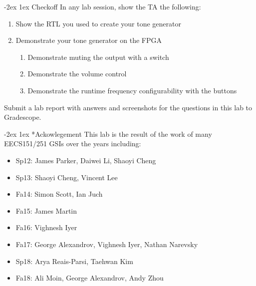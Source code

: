 \documentclass[11pt]{article}
\makeatletter
\renewcommand{\section}
{\@startsection {section}{1}{0pt}
 {-2ex}
 {1ex}
 {\bfseries\Large}}
\makeatother
\begin{document}
\section{Checkoff}
In any lab session, show the TA the following:
\begin{enumerate}
  \item Show the RTL you used to create your tone generator
  \item Demonstrate your tone generator on the FPGA
    \begin{enumerate}
      \item Demonstrate muting the output with a switch
      \item Demonstrate the volume control
      \item Demonstrate the runtime frequency configurability with the buttons
    \end{enumerate}
\end{enumerate}

Submit a lab report with answers and screenshots for the questions in this lab to Gradescope.

\section*{Ackowlegement}
This lab is the result of the work of many EECS151/251 GSIs over the years including:
\begin{itemize}
\item Sp12: James Parker, Daiwei Li, Shaoyi Cheng
\item Sp13: Shaoyi Cheng, Vincent Lee
\item Fa14: Simon Scott, Ian Juch
\item Fa15: James Martin
\item Fa16: Vighnesh Iyer
\item Fa17: George Alexandrov, Vighnesh Iyer, Nathan Narevsky
\item Sp18: Arya Reais-Parsi, Taehwan Kim
\item Fa18: Ali Moin, George Alexandrov, Andy Zhou
\end{itemize}
\end{document}
